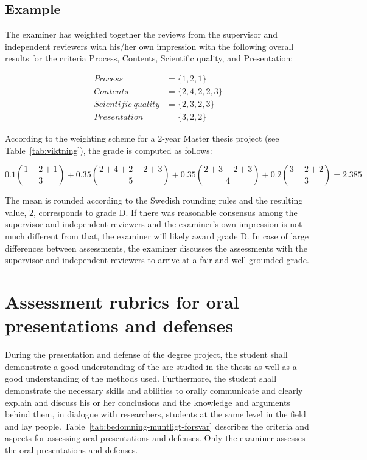 \documentclass[a4paper,12pt]{book}
\begin{document}
\subsection{Example}
\label{sec:assessment-example}
The examiner has weighted together the reviews from the supervisor and independent reviewers
with his/her own impression with the following overall results for the criteria
Process, Contents, Scientific quality, and Presentation:

\begin{align*}
        Process &= \{1,2,1\} \\
       Contents &= \{2,4,2,2,3\} \\
   Scientific\ quality &= \{2,3,2,3\} \\
   Presentation &= \{3,2,2\}
\end{align*}

According to the weighting scheme for a 2-year Master thesis 
project (see Table~\ref{tab:viktning}), the grade is computed as follows:

\begin{equation*}
   0.1(\frac{1+2+1}{3})+0.35(\frac{2+4+2+2+3}{5})+0.35(\frac{2+3+2+3}{4})+0.2(\frac{3+2+2}{3})=2.385
\end{equation*}

The mean is rounded according to the Swedish rounding rules and the resulting 
value, $2$, corresponds to grade D. If there was reasonable consensus among the
supervisor and independent reviewers and the examiner's own impression is not much
different from that, the examiner will likely award grade D.
In case of large differences between assessments, the examiner discusses the
assessments with the supervisor and independent reviewers to arrive at a fair
and well grounded grade.

\newpage
\section{Assessment rubrics for oral presentations and defenses}
During the presentation and defense of the degree project, the student shall
demonstrate a good understanding of the are studied in the thesis as well as a good understanding of the methods used.
Furthermore, the student shall demonstrate the necessary skills and abilities to orally communicate and clearly
explain and discuss his or her conclusions and the knowledge and arguments behind them, in
dialogue with researchers, students at the same level in the field and lay people. 
Table~\ref{tab:bedomning-muntligt-forsvar} describes the criteria
and aspects for assessing oral presentations and defenses. Only the examiner
assesses the oral presentations and defenses.
\end{document}
